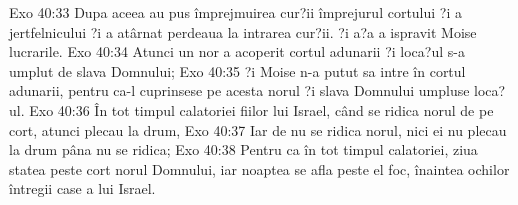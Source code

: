Exo 40:33  Dupa aceea au pus împrejmuirea cur?ii împrejurul cortului ?i a jertfelnicului ?i a atârnat perdeaua la intrarea cur?ii. ?i a?a a ispravit Moise lucrarile.
Exo 40:34  Atunci un nor a acoperit cortul adunarii ?i loca?ul s-a umplut de slava Domnului;
Exo 40:35  ?i Moise n-a putut sa intre în cortul adunarii, pentru ca-l cuprinsese pe acesta norul ?i slava Domnului umpluse loca?ul.
Exo 40:36  În tot timpul calatoriei fiilor lui Israel, când se ridica norul de pe cort, atunci plecau la drum,
Exo 40:37  Iar de nu se ridica norul, nici ei nu plecau la drum pâna nu se ridica;
Exo 40:38  Pentru ca în tot timpul calatoriei, ziua statea peste cort norul Domnului, iar noaptea se afla peste el foc, înaintea ochilor întregii case a lui Israel.


